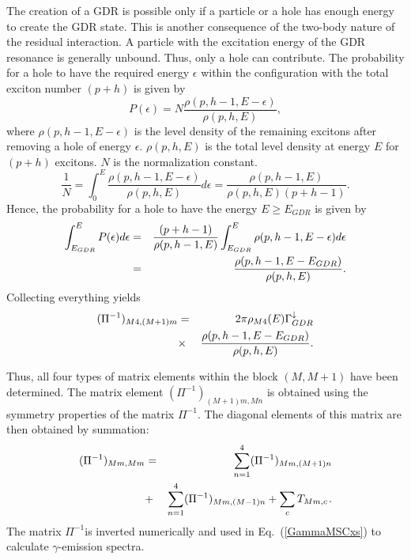 The creation of a GDR is possible
only if a particle or a hole has enough energy to create the GDR state. This
is another consequence of the two-body nature of the residual interaction. A
particle with the excitation energy of the GDR resonance is generally
unbound. Thus, only a hole can contribute. The probability for a hole to
have the required energy $\epsilon$ within the configuration with the total
exciton number $(p+h)$ is given by
\begin{equation}
P(\epsilon)=N%
\frac{\rho(p,h-1,E-\epsilon)}{\rho(p,h,E)},
\end{equation}
where $\rho(p,h-1,E-\epsilon)$ is the level density%
 of the remaining excitons after removing a hole
of energy $\epsilon$. $\rho(p,h,E)$ is the total level density at energy
$E$ for $(p+h)$ excitons. $N$ is the normalization constant.
\begin{equation}
\frac{1}{N}=\int_{0}^{E}\frac{\rho(p,h-1,E-\epsilon)}{\rho(p,h,E)}d\epsilon=%
\frac{\rho(p,h-1,E)}{\rho(p,h,E)(p+h-1)}.
\end{equation}
Hence, the probability for a hole to have the energy $E\geq E_{GDR}$ is
given by
\begin{eqnarray}
\int_{E_{GDR}}^{E}P(\epsilon)d\epsilon & = & \frac{(p+h-1)}{\rho(p,h-1,E)}%
\int_{E_{GDR}}^{E}\rho(p,h-1,E-\epsilon)d\epsilon  \notag \\
& = & \frac{\rho(p,h-1,E-E_{GDR})}{\rho(p,h,E)}.
\end{eqnarray}
Collecting everything yields
\begin{eqnarray}
(\Pi^{-1})_{M4,(M+1)m} & = & 2\pi\rho_{M4}(E)\Gamma_{GDR}^{\downarrow} \notag \\
& \times & \frac{\rho(p,h-1,E-E_{GDR})}{\rho(p,h,E)}.
\end{eqnarray}

Thus, all four types of matrix elements within the block $(M,M+1)$ have been
determined. The matrix element $(\Pi^{-1})_{(M+1)m,Mn}$ is obtained using
the symmetry properties of the matrix $\Pi^{-1}$. The diagonal elements of
this matrix are then obtained by summation:
\begin{eqnarray}
(\Pi^{-1})_{Mm,Mm} &=& \sum_{n=1}^{4}(\Pi^{-1})_{Mm,(M+1)n} \\
&+& \sum_{n=1}^{4}(\Pi^{-1})_{Mm,(M-1)n} + \sum_{c}T_{Mm,c} \hspace{1pt}.
\notag
\end{eqnarray}
The matrix $\Pi^{-1}$is inverted numerically and used in Eq.~(\ref{GammaMSCxs})
to calculate $\gamma$-emission spectra.

